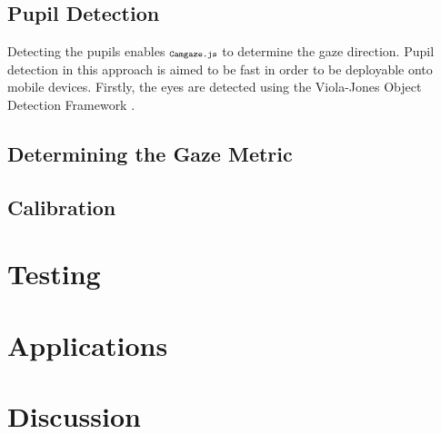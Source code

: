 \documentclass[annual]{acmsiggraph}
\newcommand{\Acronym}[1]{\ensuremath{{\small{\texttt{#1}}}}}
\newcommand{\Name}{\Acronym{Camgaze.js}}
\begin{document}
\subsection{Pupil Detection}

Detecting the pupils enables $\Name$ to determine the gaze direction.
Pupil detection in this approach is aimed to be fast in order to 
be deployable onto mobile devices. Firstly, the eyes are detected
using the Viola-Jones Object Detection Framework \cite{Viola01}. 

\subsection{Determining the Gaze Metric}

\subsection{Calibration}

\section{Testing}

\section{Applications}

\section{Discussion}



\end{document}
